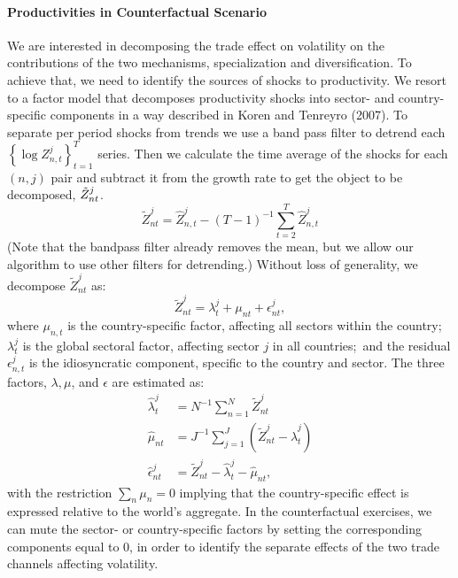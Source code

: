 \documentclass[12pt]{article}
\begin{document}
\paragraph{Productivities in Counterfactual Scenario}

We are interested in decomposing the trade effect on volatility on the
contributions of the two mechanisms, specialization and diversification. To
achieve that, we need to identify the sources of shocks to productivity. We
resort to a factor model that decomposes productivity shocks into sector-
and country-specific components in a way described in Koren and Tenreyro
(2007). To separate per period shocks from trends we use a band pass filter
to detrend each $\left\{ \log {Z_{n,t}^{j}}\right\} _{t=1}^{T}$ series. Then
we calculate the time average of the shocks for each $(n,j)$ pair and
subtract it from the growth rate to get the object to be decomposed, $\tilde{%
Z}_{nt}^{j}$. 
\begin{equation*}
\tilde{Z}_{nt}^{j}=\hat{Z}_{n,t}^{j}-(T-1)^{-1}\sum_{t=2}^{T}\hat{Z}%
_{n,t}^{j}
\end{equation*}
(Note that the bandpass filter already removes the mean, but we allow our algorithm to use other filters for detrending.)
Without loss of generality, we decompose $\tilde{Z}_{nt}^{j}$ as: 
\begin{equation*}
\tilde{Z}_{nt}^{j}=\lambda _{t}^{j}+\mu _{nt}+\epsilon _{nt}^{j},
\end{equation*}%
where ${\mu _{n,t}}$ is the country-specific factor, affecting all sectors
within the country; $\lambda _{t}^{j}$ is the global sectoral factor,
affecting sector $j$ in all countries;\ and the residual $\epsilon
_{n,t}^{j} $ is the idiosyncratic component, specific to the country and
sector. The three factors, $\lambda ,\mu $, and $\epsilon $ are estimated
as: 
\begin{align*}
\hat{\lambda}_{t}^{j}& =N^{-1}\sum_{n=1}^{N}\tilde{Z}_{nt}^{j} \\
\hat{\mu}_{nt}& =J^{-1}\sum_{j=1}^{J}\left( \tilde{Z}_{nt}^{j}-\hat{\lambda}%
_{t}^{j}\right) \\
\hat{\epsilon}_{nt}^{j}& =\tilde{Z}_{nt}^{j}-\hat{\lambda}_{t}^{j}-\hat{\mu}%
_{nt}\text{,}
\end{align*}%
with the restriction $\sum_{n}{\mu _{n}}=0$ implying that the
country-specific effect is expressed relative to the world's aggregate. In
the counterfactual exercises, we can mute the sector- or country-specific
factors by setting the corresponding components equal to 0, in order to
identify the separate effects of the two trade channels affecting
volatility.\bigskip
\end{document}
